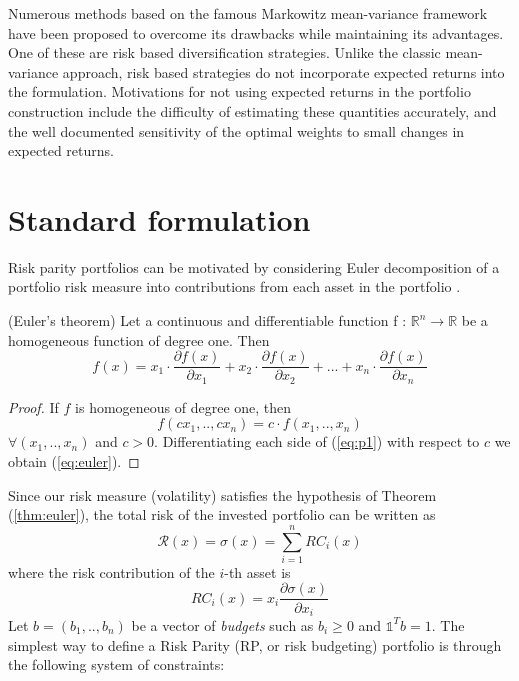 Numerous methods based on the famous Markowitz mean-variance framework have been proposed to overcome its drawbacks while maintaining its advantages. One of these are risk based diversification strategies. Unlike the classic mean-variance approach, risk based strategies do not incorporate expected returns into the formulation. Motivations for not using expected returns in the portfolio construction include the difficulty of estimating these quantities accurately, and the well documented sensitivity of the optimal weights to small changes in expected returns. 

\section{Standard formulation}
Risk parity portfolios can be motivated by considering Euler decomposition of a portfolio risk measure into contributions from each asset in the portfolio \cite{tutuncu}.
\begin{theorem}\label{thm:euler}
(Euler’s theorem) Let a continuous and differentiable function f : $\mathbb{R}^n \longrightarrow \mathbb{R}$ be a homogeneous function of degree one. Then
\begin{equation}\label{eq:euler}
f(x) = x_1\cdot\frac{\partial f(x)}{\partial x_1} + x_2\cdot\frac{\partial f(x)}{\partial x_2} + ... + x_n\cdot\frac{\partial f(x)}{\partial x_n}
\end{equation}
\end{theorem}
\begin{proof}
If $f$ is homogeneous of degree one, then
\begin{equation}\label{eq:p1}
f(c x_1, .., c x_n) = c \cdot f(x_1, .., x_n)
\end{equation}
$\forall (x_1, .., x_n)$  and  $c > 0$. Differentiating each side of (\ref{eq:p1}) with respect to $c$ we obtain (\ref{eq:euler}).
\end{proof}
Since our risk measure (volatility) satisfies the hypothesis of Theorem (\ref{thm:euler}), the total risk of the invested portfolio can be written as
\begin{equation}\label{eq:total}
\mathcal{R}(x) = \sigma(x) = \sum_{i=1}^n RC_i(x)
\end{equation} 
where the risk contribution of the $i$-th asset is
\begin{equation}\label{eq:marg}
RC_i(x) = x_i \frac{\partial \sigma(x)}{\partial x_i}
\end{equation} 
Let $b=(b_1,..,b_n)$ be a vector of \textit{budgets} such as $b_i \geq 0$ and $\mathds{1}^T b = 1$. The simplest way to define a Risk Parity \cite{bruder} (RP, or risk budgeting) portfolio is through the following system of constraints:\\
